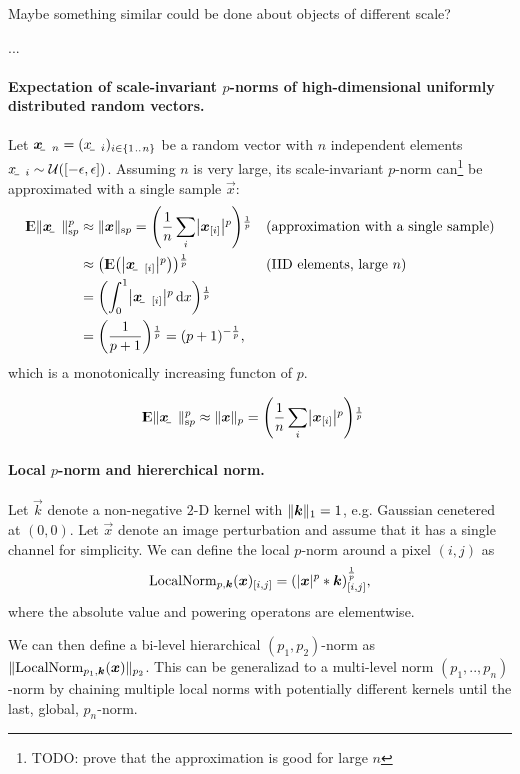 \documentclass{article}
\begin{document}
Maybe something similar could be done about objects of different scale?

...

\paragraph{Expectation of scale-invariant $p$-norms of high-dimensional uniformly distributed random vectors.}
Let $\rvec x_n = \del{\rvar x_i}_{i\in\cbr{1\bidot n}}$ be a random vector with $n$ independent elements $\rvar x_i\sim\mathcal{U}\del{\intcc{-\epsilon,\epsilon}}$.
Assuming $n$ is very large, its scale-invariant $p$-norm can\footnote{TODO: prove that the approximation is good for large $n$} be approximated with a single sample $\vec x$:
\begin{align*}
	\E \enVert{\rvec x}_{\text{s}p}^p &\approx \enVert{\vec x}_{\text{s}p} = \del{\frac{1}{n}\sum_i \envert{\vec{x}_\ind{i}}^p}^\frac{1}{p} &&\text{(approximation with a single sample)}\\
	&\approx \del{\E\del{\envert{\rvec{x}_\ind{i}}^p}}^\frac{1}{p} &&\text{(IID elements, large $n$)}  \\
	&= \del{\int_{0}^{1}\envert{\rvec{x}_\ind{i}}^p\dif x}^\frac{1}{p} \\	
	&= \del{\frac{1}{p+1}}^\frac{1}{p} = (p+1)^{-\frac{1}{p}} \text{,}
\end{align*}
which is a monotonically increasing functon of $p$.


\begin{align*}
\E \enVert{\rvec x}_{\text{s}p}^p &\approx \enVert{\vec x}_p = \del{\frac{1}{n}\sum_i \envert{\vec{x}_\ind{i}}^p}^\frac{1}{p}
\end{align*}

\paragraph{Local $p$-norm and hiererchical norm.}
Let $\vec k$ denote a non-negative $2$-D kernel with $\enVert{\vec k}_1=1$, e.g. Gaussian cenetered at $(0,0)$. Let $\vec x$ denote an image perturbation and assume that it has a single channel for simplicity.
We can define the local $p$-norm around a pixel $(i, j)$ as
\begin{align}
    \mathrm{LocalNorm}_{p,\vec k}(\vec x)_\ind{i,j} = \del{\envert{\vec x}^p * \vec k}_\ind{i,j}^\frac{1}{p},
\end{align}
where the absolute value and powering operatons are elementwise.

We can then define a bi-level hierarchical $(p_1,p_2)$-norm as $\enVert{\mathrm{LocalNorm}_{p_1,\vec k}(\vec x)}_{p_2}$. This can be generalizad to a multi-level norm $(p_1,..,p_n)$-norm by chaining multiple local norms with potentially different kernels until the last, global, $p_n$-norm.
\end{document}
